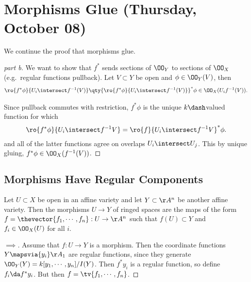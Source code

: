 \hypertarget{morphisms-glue-thursday-october-08}{%
\section{Morphisms Glue (Thursday, October
08)}\label{morphisms-glue-thursday-october-08}}

We continue the proof that morphisms glue.

\begin{proof}[part b]

We want to show that \(f^*\) sends sections of \(\OO_Y\) to sections of
\(\OO_X\) (e.g.~regular functions pullback). Let \(V\subset Y\) be open
and \(\phi \in \OO_Y(V)\), then
\begin{align*}  
\ro{f^* \phi}{U_i \intersect f^{-1} (V)}
\qty{ \ro{f^* \phi}{U_i \intersect f^{-1} (V)} }^* \phi \in 
\OO_X(U_i f^{-1} (V))
.\end{align*}

Since pullback commutes with restriction, \(f^* \phi\) is the unique
\(k\dash\)valued function for which
\begin{align*}  
\ro{f^* \phi}{U_i \intersect f^{-1} V} =
\ro{f}{U_i\intersect f^{-1} V}^* \phi
.\end{align*} and all of the latter functions agree on overlaps
\(U_i \intersect U_j\). This by unique gluing,
\(f^* \phi \in \OO_X(f^{-1}(V))\).

\end{proof}

\hypertarget{morphisms-have-regular-components}{%
\subsection{Morphisms Have Regular
Components}\label{morphisms-have-regular-components}}

\begin{proposition}

Let \(U\subset X\) be open in an affine variety and let
\(Y\subset \AA^n\) be another affine variety. Then the morphisms
\(U\to Y\) of ringed spaces are the maps of the form
\(f = \thevector{f_1, \cdots, f_n}: U\to \AA^n\) such that
\(f(U) \subset Y\) and \(f_i \in \OO_X(U)\) for all \(i\).

\end{proposition}

\begin{proof}[$\implies$]

Assume that \(f: U\to Y\) is a morphism. Then the coordinate functions
\(Y\mapsvia{y_i} \AA_1\) are regular functions, since they generate
\(\OO_Y(Y) = k[y_1, \cdots, y_n]/I(Y)\). Then \(f^* y_i\) is a regular
function, so define \(f_i \da f^* y_i\). But then
\(f = \tv{f_1, \cdots, f_n}\).

\end{proof}

